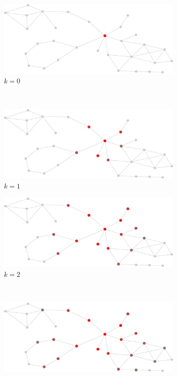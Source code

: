 \documentclass[12pt]{report}
\begin{document}
\begin{figure}[tpb]
  \centering
  \begin{subfigure}[b]{0.5\textwidth}
    \includegraphics[width=\textwidth]{frame0}
		\caption{$k=0$}
    \label{fig:ci_diffusion_frame0}
  \end{subfigure}%
  ~
  \begin{subfigure}[b]{0.5\textwidth}
    \includegraphics[width=\textwidth]{frame1}
    \caption{$k=1$}
  \end{subfigure}
  \begin{subfigure}[b]{0.5\textwidth}
    \includegraphics[width=\textwidth]{frame2}
		\caption{$k=2$}
  \end{subfigure}%
  ~
  \begin{subfigure}[b]{0.5\textwidth}
    \includegraphics[width=\textwidth]{frame3}

\end{subfigure}
\end{figure}
\end{document}
